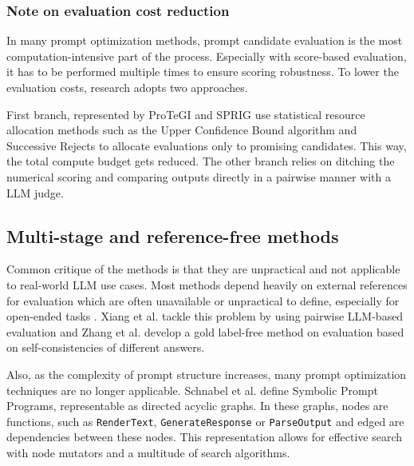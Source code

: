 \subsubsection{Note on evaluation cost reduction} 
In many prompt optimization methods, prompt candidate evaluation is the most computation-intensive part of the process.
Especially with score-based evaluation, it has to be performed multiple times to ensure scoring robustness\cite{xiang2025selfsupervisedpromptoptimization}.
To lower the evaluation costs, research adopts two approaches. 

First branch, represented by ProTeGI\cite{pryzant2023automaticpromptoptimizationgradient} and SPRIG\cite{zhang2024sprigimprovinglargelanguage} use statistical resource allocation methods such as the
Upper Confidence Bound algorithm and Successive Rejects to allocate evaluations only to promising candidates. This way, the total compute budget gets reduced.
The other branch relies on ditching the numerical scoring and comparing outputs directly in a pairwise manner with a LLM judge\cite{xiang2025selfsupervisedpromptoptimization}.

\subsection{Multi-stage and reference-free methods}

Common critique of the methods is that they are unpractical and not applicable to real-world LLM use cases.
Most methods depend heavily on external references for evaluation which are often unavailable or 
unpractical to define, especially for open-ended tasks \cite{xiang2025selfsupervisedpromptoptimization}.
Xiang et al.\cite{xiang2025selfsupervisedpromptoptimization} tackle this problem by using pairwise LLM-based evaluation
and Zhang et al.\cite{zhang2024glapegoldlabelagnosticprompt} develop a gold label-free method on evaluation based
on self-consistencies of different answers.

Also, as the complexity of prompt structure increases, many prompt optimization techniques are no longer applicable\cite{schnabel2024symbolicpromptprogramsearch}.
Schnabel et al.\cite{schnabel2024symbolicpromptprogramsearch} define Symbolic Prompt Programs, representable
as directed acyclic graphs. In these graphs, nodes are functions, such as \texttt{RenderText}, \texttt{GenerateResponse} or \texttt{ParseOutput} 
and edged are dependencies between these nodes. This representation allows for effective search with node mutators
and a multitude of search algorithms.

